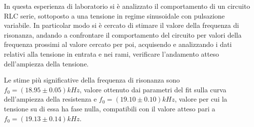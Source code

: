In questa esperienza di laboratorio si è analizzato il comportamento di un circuito RLC serie, sottoposto a una tensione
in regime sinusoidale con pulsazione variabile.
In particolar modo si è cercato di stimare il valore della frequenza di risonanza, andando a confrontare il comportamento
del circuito per valori della frequenza prossimi
al valore cercato per poi, acquisendo e analizzando i dati relativi alla tensione in entrata e nei rami, verificare
l’andamento atteso dell’ampiezza della tensione.

Le stime più significative della frequenza di risonanza sono $f_0 = (18.95 \pm 0.05) kHz$, valore ottenuto dai parametri
del fit sulla curva dell’ampiezza della resistenza e $f_0 = (19.10 \pm 0.10)kHz$, valore per cui la tensione su di essa
ha fase nulla, compatibili con il valore atteso pari a \\ $f_0 = (19.13 \pm 0.14) kHz$.


